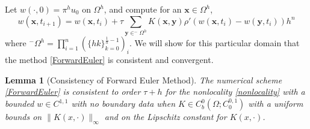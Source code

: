 \documentclass[aps,
preprint,
groupedaddress,
showkeys,
amsmath]{revtex4-2}
\newtheorem{lemma}{Lemma}
\begin{document}
    
    Let $w(\cdot, 0)=\pi^h u_0$ on $\Omega^h$, and compute for an $\mathbf{x}\in \Omega^h$,
    \begin{equation}\label{ForwardEuler}
    w(\mathbf{x},t_{i+1})=w(\mathbf{x},t_i)+\tau \sum_{\mathbf{y}\in ^-\Omega^h}K(\mathbf{x},\mathbf{y})\rho'(w(\mathbf{x},t_i)-w(\mathbf{y},t_i))h^n
    \end{equation}
    where $^-\Omega^h=\prod_{i=1}^n(\{hk\}_{k=0}^{\frac{1}{h}-1})_i$. We will show for this particular domain that the method \eqref{ForwardEuler} is consistent and convergent.
  
    
    \begin{lemma}[Consistency of Forward Euler Method]\label{LEM:Consistency}
        The numerical scheme \eqref{ForwardEuler} is consistent to order $\tau+h$ for the nonlocality \eqref{nonlocality} with a bounded $w\in C^{1,1}$ with no boundary data when $K\in C^0_b(\Omega;C^{0,1}_0)$ with a uniform bounds on $\|K(x,\cdot)\|_\infty$ and on the Lipschitz constant for $K(x,\cdot)$.
    \end{lemma}
\end{document}
